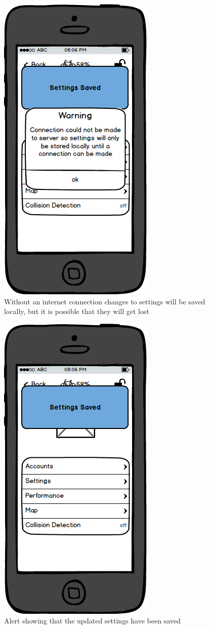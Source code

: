 \documentclass[a4paper]{report}
\begin{document}
\clearpage
\begin{figure}
\centering
\includegraphics[scale=0.9]{figures/prototype_2/settings_connection_warn}
\caption{Without an internet connection changes to settings will be saved locally, but it is possible that they will get lost}
\end{figure}
\clearpage
\begin{figure}
\centering
\includegraphics[scale=0.9]{figures/prototype_2/settings_saved}
\caption{Alert showing that the updated settings have been saved}
\end{figure}
\end{document}

